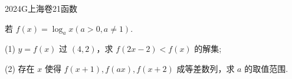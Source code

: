 
\begin{problem}{2024}{G}{上海卷}{21}{函数}

若 $f(x)=\log_a x(a>0, a\neq 1)$.

(1) $y=f(x)$ 过 $(4,2)$，求 $f(2x-2)<f(x)$ 的解集;

(2) 存在 $x$ 使得 $f(x+1), f(ax), f(x+2)$ 成等差数列，求 $a$ 的取值范围.

\end{problem}